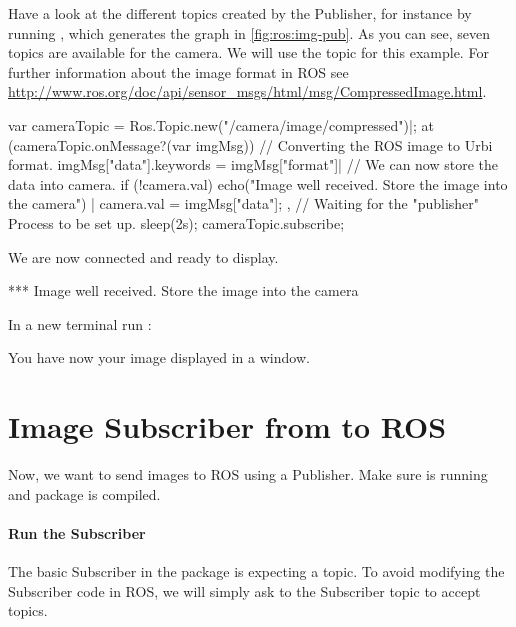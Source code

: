 Have a look at the different topics created by the Publisher, for instance
by running , which generates the graph in
\autoref{fig:ros:img-pub}.  As you can see, seven topics are available for
the camera. We will use the  topic for this
example.  For further information about the image format in ROS see
\url{http://www.ros.org/doc/api/sensor_msgs/html/msg/CompressedImage.html}.

\begin{urbiunchecked}
var cameraTopic = Ros.Topic.new("/camera/image/compressed")|;
at (cameraTopic.onMessage?(var imgMsg))
{
  // Converting the ROS image to Urbi format.
  imgMsg["data"].keywords = imgMsg["format"]|
  // We can now store the data into camera.
  if (!camera.val)
    echo("Image well received. Store the image into the camera") |
  camera.val = imgMsg["data"];
},
// Waiting for the "publisher" Process to be set up.
sleep(2s);
cameraTopic.subscribe;
\end{urbiunchecked}

We are now connected and ready to display.

\begin{urbiunchecked}
[00000003] *** Image well received. Store the image into the camera
\end{urbiunchecked}

In a new terminal run :


You have now your image displayed in a window.

\section{Image Subscriber from \urbi to ROS}

Now, we want to send images to ROS using a \urbi Publisher.
Make sure  is running and
 package is compiled.

\paragraph{Run the Subscriber}

The basic Subscriber in the  package
is expecting a  topic. To avoid modifying the
Subscriber code in ROS, we will simply ask to the Subscriber topic
to accept  topics.

